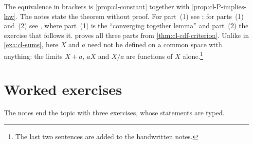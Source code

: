 The equivalence in brackets is \cref{prop:cl-constant} together with
\cref{prop:cl-P-implies-law}. The notes state the theorem without proof. For part~(1) see
\citet[Section~25, ``Convergence in Probability'']{billingsley}; for parts~(1) and~(2) see
\citet[Section~3.2]{durrett}, where part~(1) is the ``converging together lemma'' and part~(2)
the exercise that follows it.  proves all three parts
from \cref{thm:cl-cdf-criterion}. Unlike in \cref{exa:cl-sums}, here $X$ and $a$ need not be
defined on a common space with anything: the limits $X+a$, $aX$ and $X/a$ are functions of $X$
alone.\footnote{The last two sentences are added to the handwritten notes.}

\section{Worked exercises}\label{sec:cl-worked}

The notes end the topic with three exercises, whose statements are typed.

